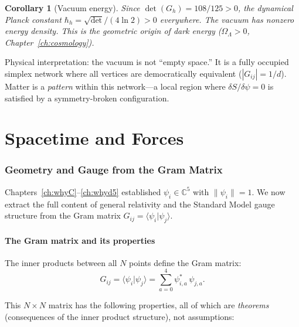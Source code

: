 \documentclass[12pt]{article}
\newtheorem{corollary}[theorem]{Corollary}
\theoremstyle{remark}
\theoremstyle{definition}
\newcommand{\CC}{\mathbb{C}}
\begin{document}
\begin{corollary}[Vacuum energy]
Since $\det(G_h) = 108/125 > 0$, the dynamical Planck constant $\hbar_h = \sqrt{\det}/(4\ln 2) > 0$ everywhere.  The vacuum has nonzero energy density.  This is the geometric origin of dark energy ($\Omega_\Lambda > 0$, Chapter~\ref{ch:cosmology}).
\end{corollary}

Physical interpretation: the vacuum is not ``empty space.'' It is a fully occupied simplex network where all vertices are democratically equivalent ($|G_{ij}| = 1/d$).  Matter is a \emph{pattern} within this network---a local region where $\delta S/\delta\psi = 0$ is satisfied by a symmetry-broken configuration.



\part{Spacetime and Forces}

\section{Geometry and Gauge from the Gram Matrix}
\label{ch:geometry}

Chapters~\ref{ch:whyC}--\ref{ch:whyd5} established $\psi_i \in \CC^5$ with $\|\psi_i\| = 1$. We now extract the full content of general relativity and the Standard Model gauge structure from the Gram matrix $G_{ij} = \langle\psi_i|\psi_j\rangle$.

\subsection{The Gram matrix and its properties}

The inner products between all $N$ points define the Gram matrix:
\begin{equation}
G_{ij} = \langle\psi_i|\psi_j\rangle = \sum_{a=0}^{4} \psi^*_{i,a}\,\psi_{j,a}.
\end{equation}

This $N \times N$ matrix has the following properties, all of which are \emph{theorems} (consequences of the inner product structure), not assumptions:
\end{document}
